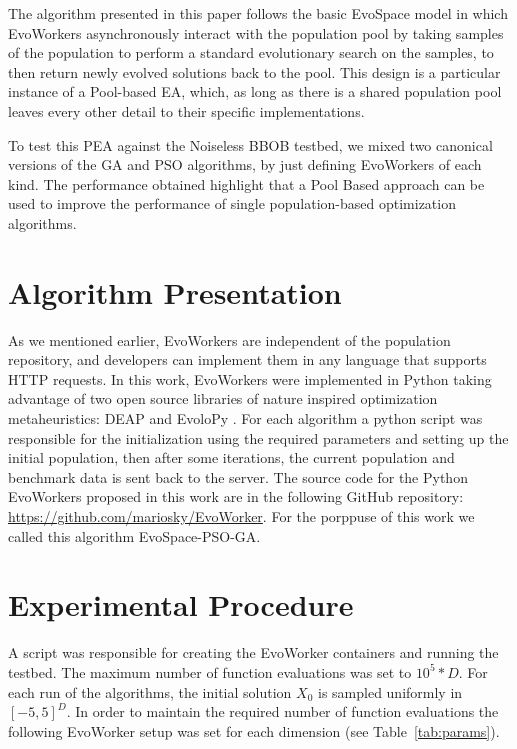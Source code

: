 \documentclass[sigconf]{acmart}
\begin{document}
The algorithm presented in this paper follows the basic  EvoSpace model
\cite{GValdez2015} in which EvoWorkers  asynchronously interact with the
population pool by taking samples of the population to perform a standard
evolutionary search on the samples, to then return newly evolved solutions back
to the pool. This design is a particular instance of a Pool-based EA, which, as
long as there is a shared population pool leaves every other detail to their
specific implementations.


To test this PEA against the Noiseless BBOB testbed, 
we mixed two canonical versions of the GA and PSO algorithms, 
by just defining EvoWorkers of each kind. The performance 
obtained highlight 
that a Pool Based approach can be used to improve the performance 
of single population-based optimization algorithms.

\section{Algorithm Presentation}

As we mentioned earlier, EvoWorkers are independent of 
the population repository, and developers can implement them 
in any language that supports HTTP requests. In this work,  
EvoWorkers were implemented in Python taking advantage of 
two open source libraries of nature inspired optimization 
metaheuristics:  DEAP \cite{fortin2012deap} and EvoloPy 
\cite{faris2016evolopy}. For each algorithm a 
python script was responsible for the initialization using 
the required parameters and setting up the initial population, 
then after some iterations, the current population and 
benchmark data is sent back to the server. The source code 
for the Python EvoWorkers proposed in this work are in 
the following GitHub repository: \url{https://github.com/mariosky/EvoWorker}.
For the porppuse of this work we called this algorithm EvoSpace-PSO-GA.  


%
\section{Experimental Procedure}
A script was responsible for creating the EvoWorker 
containers and running the testbed. The maximum number of 
function evaluations was set to $10^5*D$. For each run 
of the algorithms, the initial solution
$X_0$ is sampled uniformly in $[−5, 5]^D$.
In order to maintain the required number of function 
evaluations the following EvoWorker setup was set for
each dimension (see Table~\ref{tab:params}).
\end{document}
